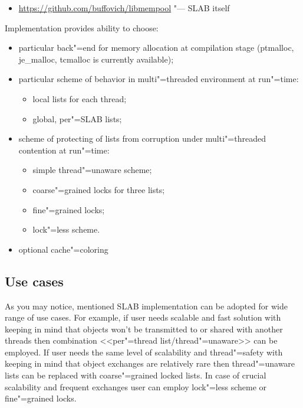 \documentclass[10pt, a5paper]{article}
\begin{document}
\begin{itemize}
  \item \url{https://github.com/buffovich/libmempool} "--- SLAB itself
\end{itemize}

Implementation provides ability to choose:

\begin{itemize}
  \item particular back"=end for memory allocation at compilation stage (ptmalloc, je\_malloc, tcmalloc is currently available);
  \item particular scheme of behavior in multi"=threaded environment at run"=time:
  \begin{itemize}
    \item local lists for each thread;
    \item global, per"=SLAB lists;
  \end{itemize}
  \item scheme of protecting of lists from corruption under multi"=threaded contention at run"=time:
  \begin{itemize}
   \item simple thread"=unaware scheme;
   \item coarse"=grained locks for three lists;
   \item fine"=grained locks;
   \item lock"=less scheme.
  \end{itemize}
  \item optional cache"=coloring
\end{itemize}

\subsection*{Use cases}

As you may notice, mentioned SLAB implementation can be adopted for wide range of use cases. For example, if user needs scalable and fast solution with keeping in mind that objects won't be transmitted to or shared with another threads then combination <<per"=thread list/thread"=unaware>> can be employed. If user needs the same level of scalability and thread"=safety with keeping in mind that object exchanges are \linebreak relatively rare then thread"=unaware lists can be replaced with coarse"=grained locked lists. In case of crucial scalability and frequent exchanges user can employ lock"=less scheme or fine"=grained locks.
\end{document}
